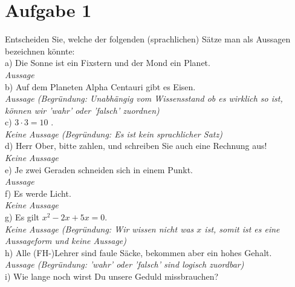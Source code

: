 \section*{Aufgabe 1}

Entscheiden Sie, welche der folgenden (sprachlichen) Sätze man als Aussagen bezeichnen könnte:\\

a) Die Sonne ist ein Fixstern und der Mond ein Planet.\\

\textit{Aussage}\\

b) Auf dem Planeten Alpha Centauri gibt es Eisen.\\

\textit{Aussage (Begründung: Unabhängig vom Wissensstand ob es wirklich so ist, können wir 'wahr' oder 'falsch' zuordnen)}\\

c) $3 \cdot 3 = 10$ .\\

\textit{Keine Aussage (Begründung: Es ist kein sprachlicher Satz)}\\

d) Herr Ober, bitte zahlen, und schreiben Sie auch eine Rechnung aus!\\

\textit{Keine Aussage}\\

e) Je zwei Geraden schneiden sich in einem Punkt.\\

\textit{Aussage}\\

f) Es werde Licht.\\

\textit{Keine Aussage}\\

g) Es gilt $x^2 - 2x + 5x = 0$.\\

\textit{Keine Aussage (Begründung: Wir wissen nicht was $x$ ist, somit ist es eine Aussageform und keine Aussage)}\\

h) Alle (FH-)Lehrer sind faule Säcke, bekommen aber ein hohes Gehalt.\\

\textit{Aussage (Begründung: 'wahr' oder 'falsch' sind logisch zuordbar)}\\

i) Wie lange noch wirst Du unsere Geduld missbrauchen?\\

